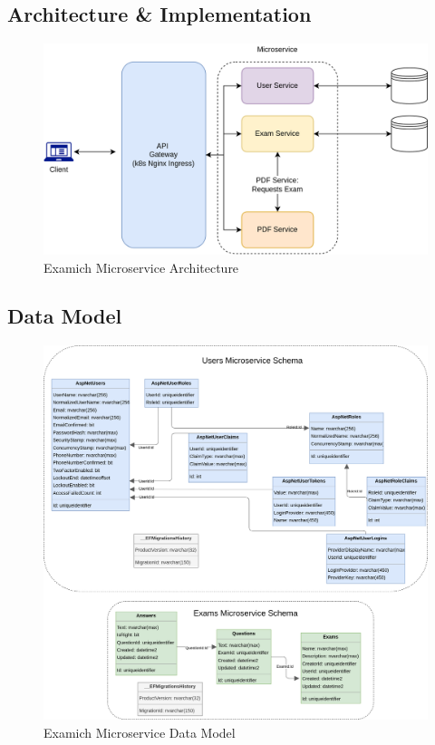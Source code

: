 \documentclass[BIF,Bachelor,nenglish]{twbook}%
\begin{document}
\subsection{Architecture \& Implementation}
\begin{figure} [H]
 \begin{center}
    \includegraphics[width=1\linewidth]{img/ExamichMicroserviceArchitecture.png}
 \end{center}
 \caption{Examich Microservice Architecture}
 \label{examichMicroservice}
\end{figure}

\subsection{Data Model}

\begin{figure} [H]
 \begin{center}
    \includegraphics[width=1\linewidth]{img/ExamichMicroserviceDataModel.png}
 \end{center}
 \caption{Examich Microservice Data Model}
 \label{datamodelmicroservice}
\end{figure}
\end{document}
